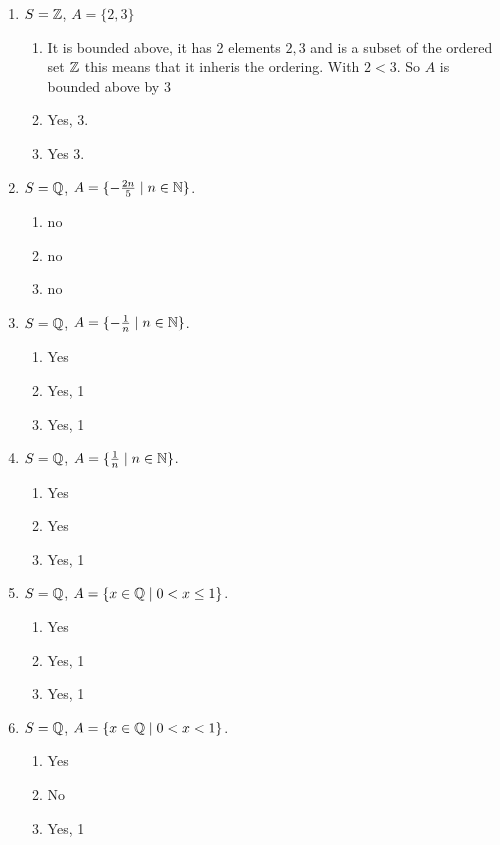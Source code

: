 \documentclass{report}
\begin{document}
\begin{proofWithHibiscus}
  \begin{enumerate}
    \item $S = \mathbb{Z}$, $A = \{2, 3 \}$ 
      \begin{enumerate}
        \item It is bounded above, it has 2 elements $2,3$ and is a subset of the ordered set $\mathbb{Z}$ 
          this means that it inheris the ordering. With $2 < 3$. So $A$ is bounded above by $3$
        \item Yes, 3. 
        \item Yes 3. 
      \end{enumerate}
    \item $S = \mathbb{Q}$, $A = \{ -\frac{2n}{5} \mid n \in \mathbb{N} \}$.
      \begin{enumerate}
        \item no
        \item no
        \item no 
      \end{enumerate}
    \item $S = \mathbb{Q}$, $A = \{ -\frac{1}{n} \mid n \in \mathbb{N} \}$.
      \begin{enumerate}
        \item Yes 
        \item Yes, 1
        \item Yes, 1
      \end{enumerate}
    \item $S = \mathbb{Q}$, $A = \{ \frac{1}{n} \mid n \in \mathbb{N} \}$.
      \begin{enumerate}
        \item Yes
        \item Yes
        \item Yes, 1 
      \end{enumerate}
    \item $S = \mathbb{Q}$, $A = \{ x \in \mathbb{Q} \mid 0 < x \le 1 \}$.
      \begin{enumerate}
        \item Yes
        \item Yes, 1 
        \item Yes, 1
      \end{enumerate}
    \item $S = \mathbb{Q}$, $A = \{ x \in \mathbb{Q} \mid 0 < x < 1 \}$.
      \begin{enumerate}
        \item Yes
        \item No 
        \item Yes, 1 
      \end{enumerate}
  \end{enumerate}
\end{proofWithHibiscus}
\end{document}
